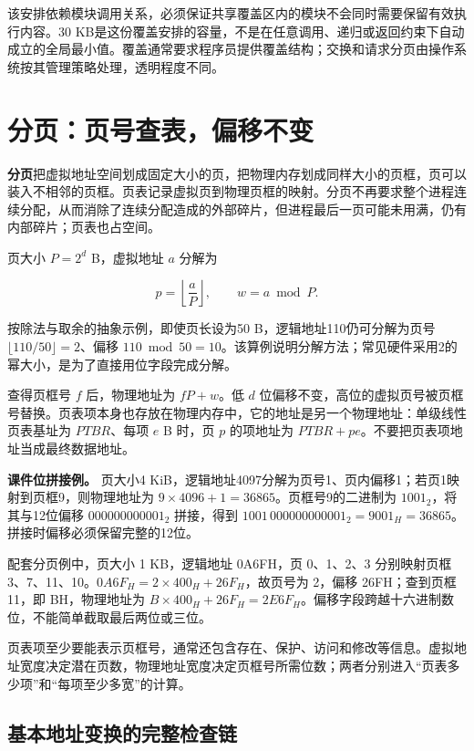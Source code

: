 该安排依赖模块调用关系，必须保证共享覆盖区内的模块不会同时需要保留有效执行内容。30 KB是这份覆盖安排的容量，不是在任意调用、递归或返回约束下自动成立的全局最小值。覆盖通常要求程序员提供覆盖结构；交换和请求分页由操作系统按其管理策略处理，透明程度不同。

\section{分页：页号查表，偏移不变}\label{OS03-5-4}

\textbf{分页}把虚拟地址空间划成固定大小的页，把物理内存划成同样大小的页框，页可以装入不相邻的页框。页表记录虚拟页到物理页框的映射。分页不再要求整个进程连续分配，从而消除了连续分配造成的外部碎片，但进程最后一页可能未用满，仍有内部碎片；页表也占空间。

页大小 \(P=2^d\) B，虚拟地址 \(a\) 分解为

\[p=\left\lfloor\frac aP\right\rfloor,\qquad w=a\bmod P.\]

按除法与取余的抽象示例，即使页长设为50 B，逻辑地址110仍可分解为页号 \(\lfloor110/50\rfloor=2\)、偏移 \(110\bmod50=10\)。该算例说明分解方法；常见硬件采用2的幂大小，是为了直接用位字段完成分解。

查得页框号 \(f\) 后，物理地址为 \(fP+w\)。低 \(d\) 位偏移不变，高位的虚拟页号被页框号替换。页表项本身也存放在物理内存中，它的地址是另一个物理地址：单级线性页表基址为 \(PTBR\)、每项 \(e\) B 时，页 \(p\) 的项地址为 \(PTBR+pe\)。不要把页表项地址当成最终数据地址。

\textbf{课件位拼接例。} 页大小4 KiB，逻辑地址4097分解为页号1、页内偏移1；若页1映射到页框9，则物理地址为 \(9\times4096+1=36865\)。页框号9的二进制为 \(1001_2\)，将其与12位偏移 \(000000000001_2\) 拼接，得到 \(1001\,000000000001_2=9001_H=36865\)。拼接时偏移必须保留完整的12位。

配套分页例中，页大小 1 KB，逻辑地址 0A6FH，页 0、1、2、3 分别映射页框 3、7、11、10。\(0A6F_H=2\times400_H+26F_H\)，故页号为 2，偏移 26FH；查到页框 11，即 BH，物理地址为 \(B\times400_H+26F_H=2E6F_H\)。偏移字段跨越十六进制数位，不能简单截取最后两位或三位。

页表项至少要能表示页框号，通常还包含存在、保护、访问和修改等信息。虚拟地址宽度决定潜在页数，物理地址宽度决定页框号所需位数；两者分别进入``页表多少项''和``每项至少多宽''的计算。

\subsection{基本地址变换的完整检查链}\label{OS03-page-translation}

